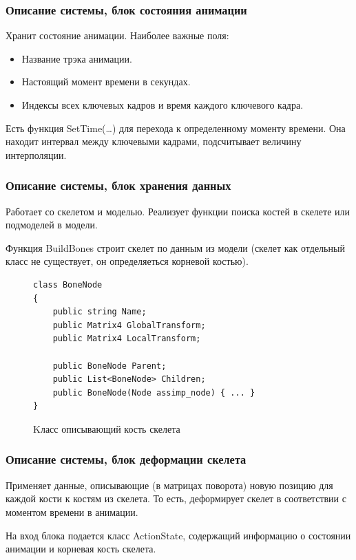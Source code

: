 \documentclass{beamer}
\begin{document}
\begin{frame}
\frametitle{Описание системы, блок состояния анимации}	
	Хранит состояние анимации. Наиболее важные поля:
\begin{itemize}        
    \item Название трэка анимации.
	\item Настоящий момент времени в секундах.
	\item Индексы всех ключевых кадров и время каждого ключевого кадра.
\end{itemize}

    Есть фyнкция SetTime(\dots) для перехода к определенному моменту времени. Она находит интервал между ключевыми кадрами, подсчитывает величину интерполяции.
\end{frame}




\begin{frame}[fragile]
\frametitle{Описание системы, блок хранения данных}
\begin{multicols}{2}
    Работает со скелетом и моделью. Реализует функции поиска костей в скелете или подмоделей в модели.
    
    \smallskip
    Функция BuildBones строит скелет по данным из модели (скелет как отдельный класс не существует, он определяеться корневой костью). 
    
    \columnbreak
    
\begin{figure}
\begin{scriptsize}
\begin{verbatim}
class BoneNode
{
    public string Name;
    public Matrix4 GlobalTransform;
    public Matrix4 LocalTransform;
    
    public BoneNode Parent;
    public List<BoneNode> Children;
    public BoneNode(Node assimp_node) { ... }
}
\end{verbatim}
\end{scriptsize}
\caption{Kласс описывающий кость скелета}
\end{figure}

\end{multicols}
\end{frame}


\begin{frame}
\frametitle{Описание системы, блок деформации скелета}
    Применяет данные, описывающие (в матрицах поворота) новую позицию для каждой кости к костям из скелета. То есть, деформирует скелет в соответствии с моментом времени в анимации.
    
    \medskip
    На вход блока подается класс ActionState, содержащий информацию о состоянии анимации и корневая кость скелета.
\end{frame}
\end{document}
